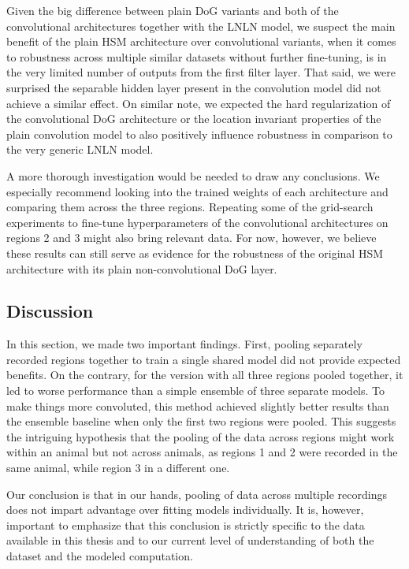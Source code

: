 Given the big difference between plain DoG variants and both of the convolutional architectures together with the LNLN model, we suspect the main benefit of the plain HSM architecture over convolutional variants, when it comes to robustness across multiple similar datasets without further fine-tuning, is in the very limited number of outputs from the first filter layer. That said, we were surprised the separable hidden layer present in the convolution model did not achieve a similar effect. On similar note, we expected the hard regularization of the convolutional DoG architecture or the location invariant properties of the plain convolution model to also positively influence robustness in comparison to the very generic LNLN model. 

A more thorough investigation would be needed to draw any conclusions. We especially recommend looking into the trained weights of each architecture and comparing them across the three regions. Repeating some of the grid-search experiments to fine-tune hyperparameters of the convolutional architectures on regions 2 and 3 might also bring relevant data. For now, however, we believe these results can still serve as evidence for the robustness of the original HSM architecture with its plain non-convolutional DoG layer.

\subsection{Discussion}

In this section, we made two important findings. First, pooling separately record\-ed regions together to train a single shared model did not provide expected benefits. On the contrary, for the version with all three regions pooled together, it led to worse performance than a simple ensemble of three separate models. To make things more convoluted, this method achieved slightly better results than the ensemble baseline when only the first two regions were pooled. 
This suggests the intriguing hypothesis that the pooling of the data across regions might work within an animal but not across animals, as regions 1 and 2 were recorded in the same animal, while region 3 in a different one. 

Our conclusion is that in our hands, pooling of data across multiple recordings does not impart advantage over fitting models individually. It is, however, important to emphasize that this conclusion is strictly specific to the data available in this thesis and to our current level of understanding of both the dataset and the modeled computation.

